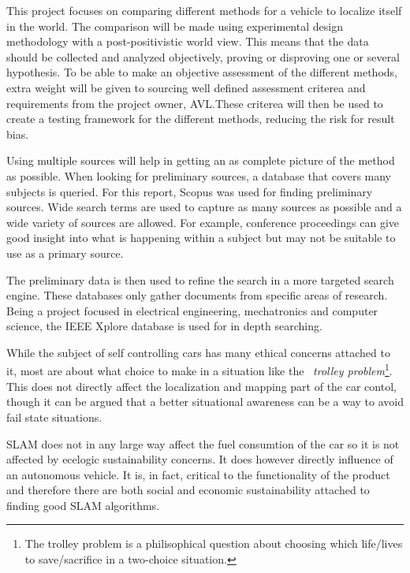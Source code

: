 This project focuses on comparing different methods for a vehicle to localize
itself in the world. The comparison will be made using experimental design
methodology with a post-positivistic world view. This means that the data should
be collected and analyzed objectively, proving or disproving one or several
hypothesis. To be able to make an objective assessment of the different methods,
extra weight will be given to sourcing well defined assessment criterea and
requirements from the project owner, AVL.\@ These criterea will then be used to
create a testing framework for the different methods, reducing the risk for
result bias.

Using multiple sources will help in getting an as complete picture of the method
as possible. When looking for preliminary sources, a database that covers many
subjects is queried. For this report, Scopus was used for finding preliminary
sources. Wide search terms are used to capture as many sources as possible and a
wide variety of sources are allowed. For example, conference proceedings can
give good insight into what is happening within a subject but may not be
suitable to use as a primary source. 

The preliminary data is then used to refine the search in a more targeted search
engine. These databases only gather documents from specific areas of research.
Being a project focused in electrical engineering, mechatronics and computer
science, the IEEE Xplore database is used for in depth searching.  

While the subject of self controlling cars has many ethical concerns attached to
it, most are about what choice to make in a situation like the ~\textit{trolley
problem}\footnote{The
trolley problem is a philisophical question about choosing which life/lives to
save/sacrifice in a two-choice situation.}. This does not directly
affect the localization and mapping part of the car contol, though it can be
argued that a better situational awareness can be a way to avoid fail state
situations. 

SLAM does not in any large way affect the fuel consumtion of the car so it is
not affected by ecelogic sustainability concerns. It does however directly
influence of an autonomous vehicle. It is, in fact, critical to the
functionality of the product and therefore there are both social and economic
sustainability attached to finding good SLAM algorithms. 
